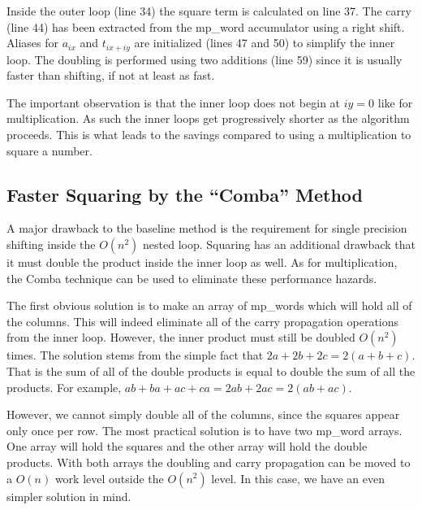 \documentclass[b5paper]{book}
\begin{document}
Inside the outer loop (line 34) the square term is calculated on line 37.  The carry (line 44) has been
extracted from the mp\_word accumulator using a right shift.  Aliases for $a_{ix}$ and $t_{ix+iy}$ are initialized 
(lines 47 and 50) to simplify the inner loop.  The doubling is performed using two
additions (line 59) since it is usually faster than shifting, if not at least as fast.  

The important observation is that the inner loop does not begin at $iy = 0$ like for multiplication.  As such the inner loops
get progressively shorter as the algorithm proceeds.  This is what leads to the savings compared to using a multiplication to
square a number. 

\subsection{Faster Squaring by the ``Comba'' Method}
A major drawback to the baseline method is the requirement for single precision shifting inside the $O(n^2)$ nested loop.  Squaring has an additional
drawback that it must double the product inside the inner loop as well.  As for multiplication, the Comba technique can be used to eliminate these
performance hazards.

The first obvious solution is to make an array of mp\_words which will hold all of the columns.  This will indeed eliminate all of the carry
propagation operations from the inner loop.  However, the inner product must still be doubled $O(n^2)$ times.  The solution stems from the simple fact
that $2a + 2b + 2c = 2(a + b + c)$.  That is the sum of all of the double products is equal to double the sum of all the products.  For example,
$ab + ba + ac + ca = 2ab + 2ac = 2(ab + ac)$.  

However, we cannot simply double all of the columns, since the squares appear only once per row.  The most practical solution is to have two 
mp\_word arrays.  One array will hold the squares and the other array will hold the double products.  With both arrays the doubling and 
carry propagation can be moved to a $O(n)$ work level outside the $O(n^2)$ level.  In this case, we have an even simpler solution in mind.
\end{document}
